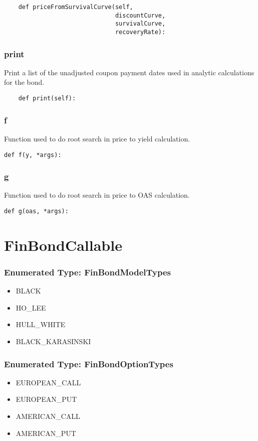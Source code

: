 \documentclass[twoside,11pt]{book}
\begin{document}
\begin{lstlisting}
    def priceFromSurvivalCurve(self,
                               discountCurve,
                               survivalCurve,
                               recoveryRate):
\end{lstlisting}

\subsubsection*{{\bf print}}
Print a list of the unadjusted coupon payment dates used in analytic calculations for the bond.  

\begin{lstlisting}
    def print(self):
\end{lstlisting}

\subsubsection*{{\bf f}}
Function used to do root search in price to yield calculation.  

\begin{lstlisting}
def f(y, *args):
\end{lstlisting}

\subsubsection*{{\bf g}}
Function used to do root search in price to OAS calculation.  

\begin{lstlisting}
def g(oas, *args):
\end{lstlisting}

\newpage
\section{FinBondCallable}

\subsubsection{Enumerated Type: FinBondModelTypes}
\begin{itemize}
\item{BLACK}
\item{HO\_LEE}
\item{HULL\_WHITE}
\item{BLACK\_KARASINSKI}
\end{itemize}

\subsubsection{Enumerated Type: FinBondOptionTypes}
\begin{itemize}
\item{EUROPEAN\_CALL}
\item{EUROPEAN\_PUT}
\item{AMERICAN\_CALL}
\item{AMERICAN\_PUT}
\end{itemize}
\end{document}
